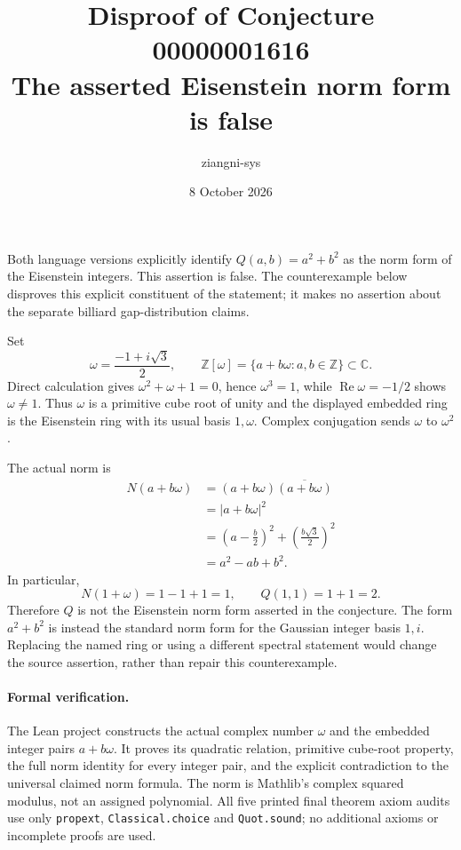 \documentclass[11pt]{article}
\title{Disproof of Conjecture 00000001616\\The asserted Eisenstein norm form is false}
\author{ziangni-sys}
\date{8 October 2026}
\begin{document}
\maketitle
Both language versions explicitly identify $Q(a,b)=a^2+b^2$ as the norm form of the Eisenstein integers. This assertion is false. The counterexample below disproves this explicit constituent of the statement; it makes no assertion about the separate billiard gap-distribution claims.

Set
\[
 \omega=\frac{-1+i\sqrt3}{2},\qquad
 \mathbb Z[\omega]=\{a+b\omega:a,b\in\mathbb Z\}\subset\mathbb C.
\]
Direct calculation gives $\omega^2+\omega+1=0$, hence $\omega^3=1$, while $\operatorname{Re}\omega=-1/2$ shows $\omega\ne1$. Thus $\omega$ is a primitive cube root of unity and the displayed embedded ring is the Eisenstein ring with its usual basis $1,\omega$. Complex conjugation sends $\omega$ to $\omega^2$.

The actual norm is
\begin{align*}
 N(a+b\omega)&=(a+b\omega)\overline{(a+b\omega)}\\
 &=|a+b\omega|^2\\
 &=\left(a-\frac b2\right)^2+\left(\frac{b\sqrt3}{2}\right)^2\\
 &=a^2-ab+b^2.
\end{align*}
In particular,
\[
 N(1+\omega)=1-1+1=1,\qquad Q(1,1)=1+1=2.
\]
Therefore $Q$ is not the Eisenstein norm form asserted in the conjecture. The form $a^2+b^2$ is instead the standard norm form for the Gaussian integer basis $1,i$. Replacing the named ring or using a different spectral statement would change the source assertion, rather than repair this counterexample.

\paragraph{Formal verification.}
The Lean project constructs the actual complex number $\omega$ and the embedded integer pairs $a+b\omega$. It proves its quadratic relation, primitive cube-root property, the full norm identity for every integer pair, and the explicit contradiction to the universal claimed norm formula. The norm is Mathlib's complex squared modulus, not an assigned polynomial. All five printed final theorem axiom audits use only \texttt{propext}, \texttt{Classical.choice} and \texttt{Quot.sound}; no additional axioms or incomplete proofs are used.
\end{document}
